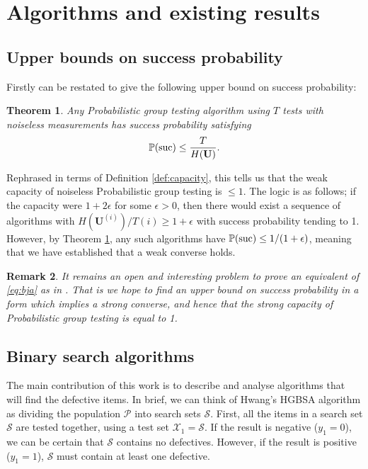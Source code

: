 \documentclass[conference]{IEEEtran}
\newtheorem{theorem}{Theorem}[section]
\newtheorem{remark}[theorem]{Remark}
\newcommand{\vc}[1]{{\mathbf{ #1}}}
\newcommand{\pr}{{\mathbb{P}}}
\newcommand{\suc}{{\rm suc}}
\newcommand{\setS}{{\mathcal{S}}}
\newcommand{\setP}{{\mathcal{P}}}
\newcommand{\setX}{{\mathcal{X}}}
\begin{document}
\section{Algorithms and existing results}

\subsection{Upper bounds on success probability} \label{sec:ub}

Firstly \cite[Theorem 1]{li5} can be restated to give the following
upper bound on success probability:
%
\begin{theorem} \label{thm:upper}
Any Probabilistic group testing algorithm using $T$ tests with noiseless measurements has success probability satisfying
$$ \pr(\suc) \leq \frac{T}{H( \vc{U})}.$$
\end{theorem}

Rephrased in terms of Definition \ref{def:capacity}, this tells us that the weak capacity of noiseless Probabilistic 
group testing is $\leq 1$. The logic is as follows; if the capacity were
$1 + 2 \epsilon$ for some $\epsilon > 0$, then there would exist a sequence of algorithms with $H(\vc{U}^{(i)})/T(i) \geq 1 + \epsilon$ with success probability tending to 1.
However, by Theorem \ref{thm:upper}, any such algorithms have $\pr(\suc) \leq 1/(1+\epsilon)$, meaning that we have 
established that a weak converse holds.

\begin{remark}
It remains an open and interesting problem to prove an equivalent of \eqref{eq:bja} as in \cite[Theorem 3.1]{johnsonc10}. That is we hope to find an upper bound
on success probability in a form  which implies a strong converse, and hence that the strong capacity of Probabilistic group
testing is equal to 1.
\end{remark}

\subsection{Binary search algorithms}

The main contribution of this work is  to describe and analyse algorithms that will find the defective items.
In brief, we can think of Hwang's HGBSA algorithm as dividing the population $\setP$ into search sets $\setS$. First, all the items in a search set $\setS$ are tested together,
using a test set $\setX_1 = \setS$. If the result is negative
($y_1 = 0$), we can be certain that $\setS$ contains no defectives. However, if the result is positive ($y_1 = 1$),  $\setS$ must contain at least one defective.
\end{document}
